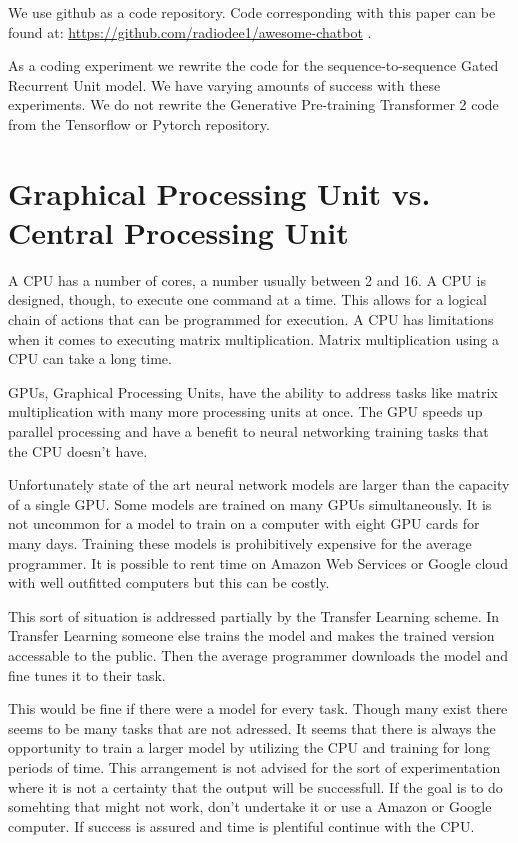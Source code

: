 We use github as a code repository. Code corresponding with this paper can be found at: \href{https://github.com/radiodee1/awesome-chatbot}{https://github.com/radiodee1/awesome-chatbot}
. 

As a coding experiment we rewrite the code for the sequence-to-sequence Gated Recurrent Unit model. We have varying amounts of success with these experiments. We do not rewrite the Generative Pre-training Transformer 2 code from the Tensorflow or Pytorch repository.

\section{Graphical Processing Unit vs. Central Processing Unit}

A CPU has a number of cores, a number usually between 2 and 16. A CPU is designed, though, to execute one command at a time. This allows for a logical chain of actions that can be programmed for execution. A CPU has limitations when it comes to executing matrix multiplication. Matrix multiplication using a CPU can take a long time.

GPUs, Graphical Processing Units, have the ability to address tasks like matrix multiplication with many more processing units at once. The GPU speeds up parallel processing and have a benefit to neural networking training tasks that the CPU doesn't have.

Unfortunately state of the art neural network models are larger than the capacity of a single GPU. Some models are trained on many GPUs simultaneously. It is not uncommon for a model to train on a computer with eight GPU cards for many days. Training these models is prohibitively expensive for the average programmer. It is possible to rent time on Amazon Web Services or Google cloud with well outfitted computers but this can be costly.

This sort of situation is addressed partially by the Transfer Learning scheme. In Transfer Learning someone else trains the model and makes the trained version accessable to the public. Then the average programmer downloads the model and fine tunes it to their task.

This would be fine if there were a model for every task. Though many exist there seems to be many tasks that are not adressed. It seems that there is always the opportunity to train a larger model by utilizing the CPU and training for long periods of time. This arrangement is not advised for the sort of experimentation where it is not a certainty that the output will be successfull. If the goal is to do somehting that might not work, don't undertake it or use a Amazon or Google computer. If success is assured and time is plentiful continue with the CPU.

